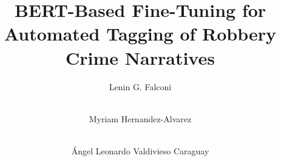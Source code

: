 \documentclass[runningheads]{llncs}
\begin{document}
%
\title{BERT-Based Fine-Tuning for Automated Tagging of Robbery Crime  Narratives}

%
%
\author{Lenin G. Falconi \and\\
Myriam Hernandez-Alvarez \and\\
Ángel Leonardo Valdivieso Caraguay}
%
%
\end{document}
